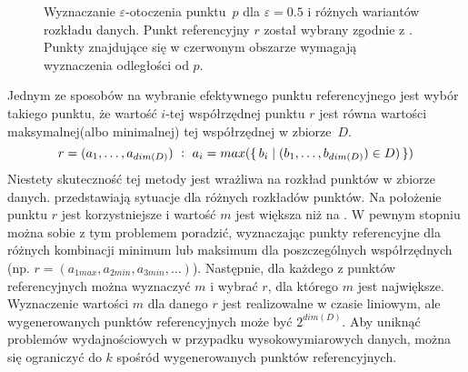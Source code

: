 \begin{figure}
\begin{minipage}[b]{.5\linewidth}
		\subcaption{}\label{img:ti-max-ref-bad}
	\end{minipage}
	\caption{Wyznaczanie $ \varepsilon $-otoczenia \mbox{punktu $ p $} dla $ \varepsilon =0.5 $ i różnych wariantów rozkładu danych. Punkt referencyjny $ r $ został wybrany zgodnie z . Punkty znajdujące się w czerwonym obszarze wymagają wyznaczenia odległości od $ p $.}\label{img:ti-max-ref}
\end{figure}

Jednym ze sposobów na wybranie efektywnego punktu referencyjnego jest wybór takiego punktu, że wartość $i $-tej współrzędnej punktu $ r $ jest równa wartości maksymalnej(albo minimalnej) tej współrzędnej w \mbox{zbiorze $ D $.}
\begin{equation}\label{eq:ti-max-ref}
	r=(a_1,\dots,a_{dim(D)})\ :\ a_i = max(\set{b_i | (b_1,\dots,b_{dim(D)}) \in D)})
\end{equation}
Niestety skuteczność tej metody jest wrażliwa na rozkład punktów w zbiorze danych.  przedstawiają sytuacje dla różnych rozkładów punktów. Na  położenie punktu $ r $ jest korzystniejsze i wartość $ m $ jest większa niż na . W pewnym stopniu można sobie z tym problemem poradzić, wyznaczając punkty referencyjne dla różnych kombinacji minimum lub maksimum dla poszczególnych współrzędnych (np. $ r=(a_{1max}, a_{2min}, a_{3min}, \dots) $). Następnie, dla każdego z punktów referencyjnych można wyznaczyć $ m $ i wybrać $ r $, dla którego $ m $ jest największe. Wyznaczenie wartości $ m $ dla danego $ r $ jest realizowalne w czasie liniowym, ale wygenerowanych punktów referencyjnych może być $ 2^{dim(D)} $. Aby uniknąć problemów wydajnościowych w przypadku wysokowymiarowych danych, można się ograniczyć do $ k $ spośród wygenerowanych punktów referencyjnych. 

